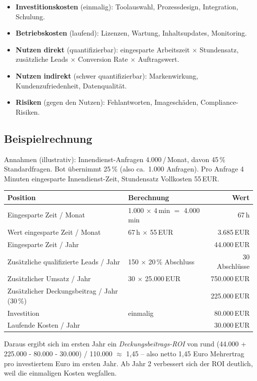 \documentclass[11pt,a4paper,oneside]{article}
\begin{document}
\begin{itemize}
  \item \textbf{Investitionskosten} (einmalig): Toolauswahl, Prozessdesign, Integration, Schulung.
  \item \textbf{Betriebskosten} (laufend): Lizenzen, Wartung, Inhaltsupdates, Monitoring.
  \item \textbf{Nutzen direkt} (quantifizierbar): eingesparte Arbeitszeit $\times$ Stundensatz, zusätzliche Leads $\times$ Conversion Rate $\times$ Auftragswert.
  \item \textbf{Nutzen indirekt} (schwer quantifizierbar): Markenwirkung, Kundenzufriedenheit, Datenqualität.
  \item \textbf{Risiken} (gegen den Nutzen): Fehlantworten, Imageschäden, Compliance-Risiken.
\end{itemize}

\subsection{Beispielrechnung}

\noindent Annahmen (illustrativ): Innendienst-Anfragen 4.000\,/\,Monat, davon 45\,\% Standardfragen. Bot übernimmt 25\,\% (also ca.\ 1.000 Anfragen). Pro Anfrage 4 Minuten eingesparte Innendienst-Zeit, Stundensatz Vollkosten 55\,EUR.

\begin{tabularx}{\linewidth}{@{}lXr@{}}
\toprule
Position & Berechnung & Wert \\
\midrule
Eingesparte Zeit / Monat & 1.000 $\times$ 4\,min $=$ 4.000\,min & 67\,h \\
Wert eingesparte Zeit / Monat & 67\,h $\times$ 55\,EUR & 3.685\,EUR \\
Eingesparte Zeit / Jahr & & 44.000\,EUR \\
Zusätzliche qualifizierte Leads / Jahr & 150 $\times$ 20\,\% Abschluss & 30 Abschlüsse \\
Zusätzlicher Umsatz / Jahr & 30 $\times$ 25.000\,EUR & 750.000\,EUR \\
Zusätzlicher Deckungsbeitrag / Jahr (30\,\%) & & 225.000\,EUR \\
Investition & einmalig & 80.000\,EUR \\
Laufende Kosten / Jahr & & 30.000\,EUR \\
\bottomrule
\end{tabularx}

\medskip

\noindent Daraus ergibt sich im ersten Jahr ein \emph{Deckungsbeitrags-ROI} von rund (44.000 + 225.000 - 80.000 - 30.000) / 110.000 $\approx$ 1{,}45 -- also netto 1,45 Euro Mehrertrag pro investiertem Euro im ersten Jahr. Ab Jahr 2 verbessert sich der ROI deutlich, weil die einmaligen Kosten wegfallen.
\end{document}
